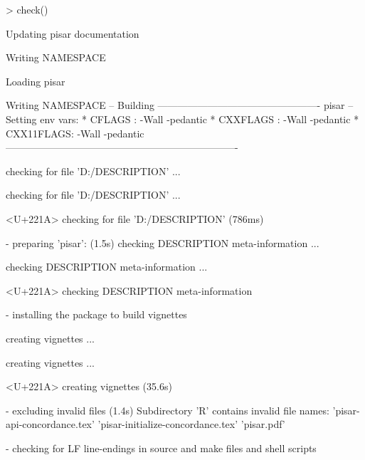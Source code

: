 \documentclass[a4paper,12pt]{article}\usepackage[]{graphicx}\usepackage[]{color}
\begin{document}
\begin{Schunk}
\begin{Sinput}
> check()
\end{Sinput}
\begin{Soutput}
Updating pisar documentation
\end{Soutput}
\begin{Soutput}
Writing NAMESPACE
\end{Soutput}
\begin{Soutput}
Loading pisar
\end{Soutput}
\begin{Soutput}
Writing NAMESPACE
-- Building ------------------------------------------------- pisar --
Setting env vars:
* CFLAGS    : -Wall -pedantic
* CXXFLAGS  : -Wall -pedantic
* CXX11FLAGS: -Wall -pedantic
----------------------------------------------------------------------
  
  
  
   checking for file 'D:\OMIKE\pisar/DESCRIPTION' ...
  
   checking for file 'D:\OMIKE\pisar/DESCRIPTION' ... 
  
<U+221A>  checking for file 'D:\OMIKE\pisar/DESCRIPTION' (786ms)

  
  
  
-  preparing 'pisar': (1.5s)
   checking DESCRIPTION meta-information ...
  
   checking DESCRIPTION meta-information ... 
  
<U+221A>  checking DESCRIPTION meta-information

  
  
  
-  installing the package to build vignettes

  
  
  
   creating vignettes ...
  
   creating vignettes ... 
  
<U+221A>  creating vignettes (35.6s)

  
  
  
-  excluding invalid files (1.4s)
   Subdirectory 'R' contains invalid file names:
     'pisar-api-concordance.tex' 'pisar-initialize-concordance.tex'
     'pisar.pdf'

  
  
  
-  checking for LF line-endings in source and make files and shell scripts


\end{Soutput}
\end{Schunk}
\end{document}
